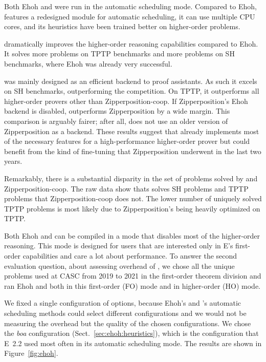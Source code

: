   Both Ehoh and \ehohii{} were run in the automatic scheduling mode. Compared to Ehoh,
  \ehohii{} features a redesigned module for automatic scheduling, it
  can use multiple CPU cores, and its heuristics have been trained better on higher-order problems.
  
  \ehohii{} dramatically improves the higher-order reasoning capabilities
  compared to Ehoh. It solves  more problems on TPTP benchmarks
  and  more problems on SH benchmarks, where Ehoh was already very
  successful.
  
  \ehohii{} was mainly designed as an efficient backend to proof assistants. As such it 
  excels on SH benchmarks, outperforming the competition. On TPTP, it outperforms all higher-order provers other than Zipperposition-coop.
  If Zipperposition's Ehoh backend is disabled,
  \ehohii{} outperforms Zipperposition by a wide margin.
  This comparison is arguably fairer; after all,
  \ehohii{} does not use an older version of Zipperposition
  as a backend.
  These results suggest that \ehohii{} already implements most of the necessary features
  for a high-performance higher-order prover
  but could benefit from the kind of fine-tuning that
  Zipperposition underwent in the last two years.
  
  Remarkably, there is a substantial disparity in the set of problems solved by
  \ehohii{} and Zipperposition-coop. The raw data show thats \ehohii{} solves
   SH problems and  TPTP problems that Zipperposition-coop
  does not. The lower number of uniquely solved TPTP problems is most likely 
  due to Zipperposition's being heavily optimized on TPTP.
  
   Both Ehoh and \ehohii{} can be compiled
  in a mode that disables most of the higher-order reasoning. This mode is
  designed for users that are interested only in E's first-order capabilities and
  care a lot about performance.
  To answer the second
  evaluation question, about assessing overhead of \ehohii{},
  we chose all the  unique problems used at CASC
  from 2019 to 2021 in the first-order theorem division and ran Ehoh and \ehohii{}
  both in this first-order (FO) mode and in higher-order (HO) mode.
  
  We fixed a single
  configuration of options, because Ehoh's and \ehohii{}'s
  automatic scheduling methods could select different configurations
  and we would not be measuring the overhead but the quality of the chosen
  configurations. We chose the \emph{boa} configuration (Sect.~\ref{sec:ehoh:heuristics}),
  which is the configuration that E~2.2 used most often in its automatic scheduling mode.
  The results are shown in Figure~\ref{fig:ehoh}.
  
